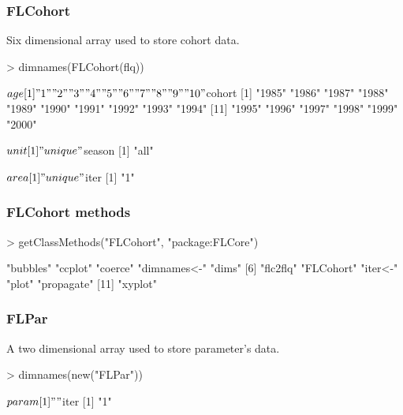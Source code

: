 \documentclass{beamer}%
\begin{document}
\begin{frame}[containsverbatim]
  \frametitle{FLCohort}

Six dimensional array used to store cohort data.\newline

{\tiny{
\begin{Schunk}
\begin{Sinput}
> dimnames(FLCohort(flq))
\end{Sinput}
\begin{Soutput}
$age
 [1] "1"  "2"  "3"  "4"  "5"  "6"  "7"  "8"  "9"  "10"

$cohort
 [1] "1985" "1986" "1987" "1988" "1989" "1990" "1991" "1992" "1993" "1994"
[11] "1995" "1996" "1997" "1998" "1999" "2000"

$unit
[1] "unique"

$season
[1] "all"

$area
[1] "unique"

$iter
[1] "1"
\end{Soutput}
\end{Schunk}
}}

\end{frame}

\begin{frame}[containsverbatim]
  \frametitle{FLCohort methods}

{\tiny{
\begin{Schunk}
\begin{Sinput}
> getClassMethods("FLCohort", "package:FLCore")
\end{Sinput}
\begin{Soutput}
 [1] "bubbles"    "ccplot"     "coerce"     "dimnames<-" "dims"      
 [6] "flc2flq"    "FLCohort"   "iter<-"     "plot"       "propagate" 
[11] "xyplot"    
\end{Soutput}
\end{Schunk}
}}

\end{frame}

\begin{frame}[containsverbatim]
  \frametitle{FLPar}

A two dimensional array used to store parameter's data.\newline

{\tiny{
\begin{Schunk}
\begin{Sinput}
> dimnames(new("FLPar"))
\end{Sinput}
\begin{Soutput}
$param
[1] ""

$iter
[1] "1"
\end{Soutput}
\end{Schunk}
}}

\end{frame}
\end{document}
